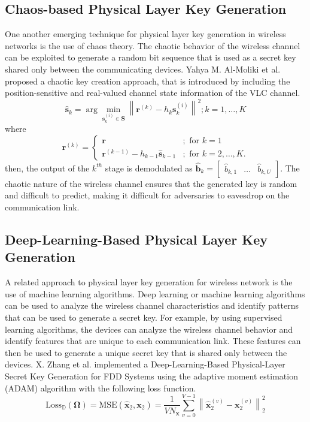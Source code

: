 \subsection{Chaos-based Physical Layer Key Generation}
One another emerging technique for physical layer key generation in wireless networks is the use of chaos theory. The chaotic behavior of the wireless channel can be exploited to generate a random bit sequence that is used as a secret key shared only between the communicating devices. Yahya M. Al-Moliki et al. proposed a chaotic key creation approach, that is introduced by including the position-sensitive and real-valued channel state information of the VLC channel\cite{https://doi.org/10.1049/iet-opt.2018.5072}. 
\begin{equation}{\widehat {\mathbf{s}}_k} = \arg \mathop {\min }\limits_{{\mathbf{s}}_k^{(i)} \in {\mathbf{S}}} {\left\| {{{\mathbf{r}}^{(k)}} - {h_k}{\mathbf{s}}_k^{(i)}} \right\|^2};k = 1, \ldots ,K\end{equation}
where
\begin{equation}{{\mathbf{r}}^{(k)}} = \begin{cases} {\mathbf{r}}&{;{\text{ for }}k = 1} \\ {{{\mathbf{r}}^{(k - 1)}} - {h_{k - 1}}{{\widehat {\mathbf{s}}}_{k - 1}}}&{;{\text{ for }}k = 2, \ldots ,K.} \end{cases}\end{equation}
then, the output of the \(k^{th}\) stage is demodulated as \({{\hat{\mathbf b}}_k} = \left[ {\begin{array}{lll} {{{\hat b}_{k,1}}}& \ldots &{{{\hat b}_{k,U}}} \end{array}} \right]\).
The chaotic nature of the wireless channel ensures that the generated key is random and difficult to predict, making it difficult for adversaries to eavesdrop on the communication link.
\subsection{Deep-Learning-Based Physical Layer Key Generation}
A related approach to physical layer key generation for wireless network is the use of machine learning algorithms. Deep learning or machine learning algorithms can be used to analyze the wireless channel characteristics and identify patterns that can be used to generate a secret key. For example, by using supervised learning algorithms, the devices can analyze the wireless channel behavior and identify features that are unique to each communication link. These features can then be used to generate a unique secret key that is shared only between the devices. X. Zhang et al. implemented a Deep-Learning-Based Physical-Layer Secret Key Generation for FDD Systems using the adaptive moment estimation (ADAM) algorithm with the following loss function\cite{9526766}. 
\begin{equation} {\mathrm{ Loss}}_{\mathbb {D}}\left ({\boldsymbol {\Omega }}\right) = {\mathrm{ MSE}}\left ({\widehat {\mathbf {x}}_{2}, \mathbf {x}_{2}}\right)=\frac {1}{VN_{\mathbf {x}}}\sum _{v=0}^{V-1}\left \|{\widehat {\mathbf {x}}_{2}^{\left ({v}\right)} -\mathbf {x}_{2}^{\left ({v}\right)}}\right \|_{2}^{2}\end{equation} 
